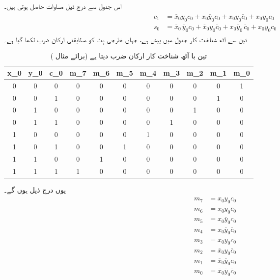 اس جدول سے درج ذیل مساوات حاصل ہوتی ہیں۔
\begin{gather}
\begin{aligned}\label{مساوات_ترکیبی_مکمل_ارکان_ضرب}
c_1&=\overline{x}_0y_0c_0+x_0\overline{y}_0c_0+x_0y_0\overline{c}_0+x_0y_0c_0\\
s_0&=\overline{x}_0\,\overline{y}_0c_0+\overline{x}_0y_0\overline{c}_0+
x_0\overline{y}_0\,\overline{c}_0+x_0y_0c_0
\end{aligned}
\end{gather}
تین سے آٹھ شناخت کار جدول  میں پیش ہے، جہاں خارجی بِٹ کو مطابقتی ارکان ضرب لکھا گیا ہے۔
\begin{table}
\caption{تین با آٹھ شناخت کار ارکان ضرب دیتا ہے (برائے مثال )}
\label{جدول_ترکیبی_شناخت_کار_ارکان_ضرب}
\centering
\begin{otherlanguage}{english}
\begin{tabular}{CCC|CCCCCCCC}
\toprule
x_0&y_0&c_0&m_7&m_6&m_5&m_4&m_3&m_2&m_1&m_0\\
&0&0&0&0&0&0&0&0&0&1\\
0&0&1&0&0&0&0&0&0&1&0\\
0&1&0&0&0&0&0&0&1&0&0\\
0&1&1&0&0&0&0&1&0&0&0\\
1&0&0&0&0&0&1&0&0&0&0\\
1&0&1&0&0&1&0&0&0&0&0\\
1&1&0&0&1&0&0&0&0&0&0\\
1&1&1&1&0&0&0&0&0&0&0\\
\bottomrule
\end{tabular}
\end{otherlanguage}
\end{table}
یوں درج ذیل ہوں گے۔
\begin{gather}
\begin{aligned}\label{مساوات_ترکیبی_شناخت_ارکان_ضرب}
m_7&=x_0y_0c_0\\
m_6&=x_0y_0\overline{c}_0\\
m_5&=x_0\overline{y}_0c_0\\
m_4&=x_0\overline{y}_0\overline{c}_0\\
m_3&=\overline{x}_0y_0c_0\\
m_2&=\overline{x}_0y_0\overline{c}_0\\
m_1&=\overline{x}_0\overline{y}_0c_0\\
m_0&=\overline{x}_0\overline{y}_0\overline{c}_0
\end{aligned}
\end{gather}
